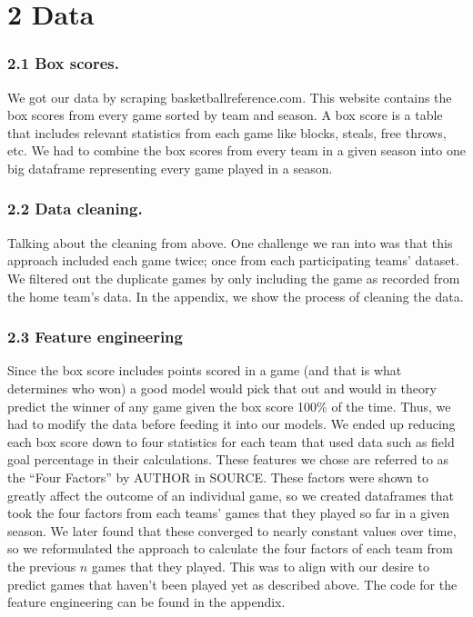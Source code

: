 \documentclass[11pt]{article}
\begin{document}
    \section{\texorpdfstring{\textbf{2 Data}}{2 Data}}\label{data}

\subsubsection{2.1 Box scores.}\label{box-scores.}

We got our data by scraping basketballreference.com. This website
contains the box scores from every game sorted by team and season. A box
score is a table that includes relevant statistics from each game like
blocks, steals, free throws, etc. We had to combine the box scores from
every team in a given season into one big dataframe representing every
game played in a season.

\subsubsection{2.2 Data cleaning.}\label{data-cleaning.}

Talking about the cleaning from above. One challenge we ran into was
that this approach included each game twice; once from each
participating teams' dataset. We filtered out the duplicate games by
only including the game as recorded from the home team's data. In the
appendix, we show the process of cleaning the data.

\subsubsection{2.3 Feature engineering}\label{feature-engineering}

Since the box score includes points scored in a game (and that is what
determines who won) a good model would pick that out and would in theory
predict the winner of any game given the box score 100\% of the time.
Thus, we had to modify the data before feeding it into our models. We
ended up reducing each box score down to four statistics for each team
that used data such as field goal percentage in their calculations.
These features we chose are referred to as the ``Four Factors'' by
AUTHOR in SOURCE. These factors were shown to greatly affect the outcome
of an individual game, so we created dataframes that took the four
factors from each teams' games that they played so far in a given
season. We later found that these converged to nearly constant values
over time, so we reformulated the approach to calculate the four factors
of each team from the previous \(n\) games that they played. This was to
align with our desire to predict games that haven't been played yet as
described above. The code for the feature engineering can be found in
the appendix.
\end{document}
